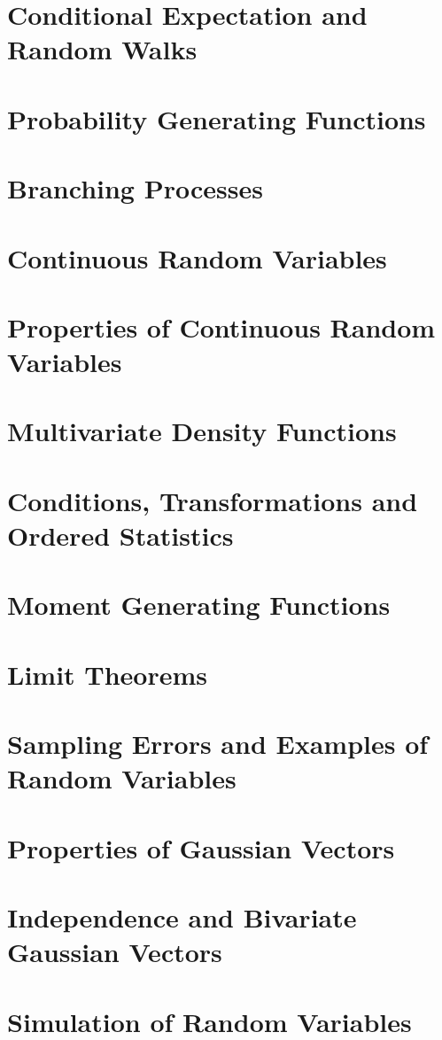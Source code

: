 \documentclass{article}
\begin{document}
\section{Conditional Expectation and Random Walks}

\section{Probability Generating Functions}

\section{Branching Processes}

\section{Continuous Random Variables}

\section{Properties of Continuous Random Variables}

\section{Multivariate Density Functions}

\section{Conditions, Transformations and Ordered Statistics}

\section{Moment Generating Functions}

\section{Limit Theorems}

\section{Sampling Errors and Examples of Random Variables}

\section{Properties of Gaussian Vectors}

\section{Independence and Bivariate Gaussian Vectors}

\section{Simulation of Random Variables}

\end{document}
